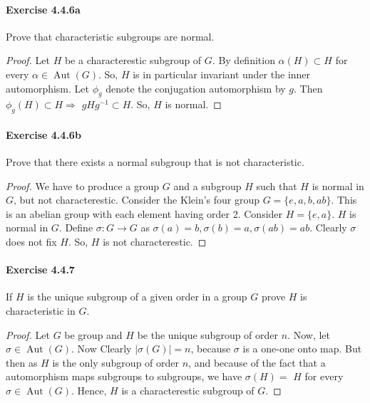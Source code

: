 \documentclass{article}
\theoremstyle{definition}
\begin{document}
\paragraph{Exercise 4.4.6a} Prove that characteristic subgroups are normal.
\begin{proof}
    Let $H$ be a characterestic subgroup of $G$. By definition $\alpha(H) \subset H$ for every $\alpha \in \operatorname{Aut}(G)$. So, $H$ is in particular invariant under the inner automorphism. Let $\phi_g$ denote the conjugation automorphism by $g$. Then $\phi_g(H) \subset H \Longrightarrow$ $g H g^{-1} \subset H$. So, $H$ is normal. 
\end{proof}



\paragraph{Exercise 4.4.6b} Prove that there exists a normal subgroup that is not characteristic.
\begin{proof}
    We have to produce a group $G$ and a subgroup $H$ such that $H$ is normal in $G$, but not characterestic. Consider the Klein's four group $G=\{ e, a, b, a b\}$. This is an abelian group with each element having order 2. Consider $H=\{ e, a\}$. $H$ is normal in $G$. Define $\sigma: G \rightarrow G$ as $\sigma(a)=b, \sigma(b)=a, \sigma(a b)=a b$. Clearly $\sigma$ does not fix $H$. So, $H$ is not characterestic.
\end{proof}



\paragraph{Exercise 4.4.7} If $H$ is the unique subgroup of a given order in a group $G$ prove $H$ is characteristic in $G$.
\begin{proof}
    Let $G$ be group and $H$ be the unique subgroup of order $n$. Now, let $\sigma \in \operatorname{Aut}(G)$. Now Clearly $|\sigma(G)|=n$, because $\sigma$ is a one-one onto map. But then as $H$ is the only subgroup of order $n$, and because of the fact that a automorphism maps subgroups to subgroups, we have $\sigma(H)=$ $H$ for every $\sigma \in \operatorname{Aut}(G)$. Hence, $H$ is a characterestic subgroup of $G$.
\end{proof}
\end{document}
